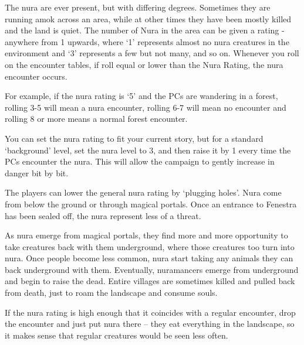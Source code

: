 \begin{multicols}{2}

The nura are ever present, but with differing degrees.  Sometimes they are running amok across an area, while at other times they have been mostly killed and the land is quiet.  The number of Nura in the area can be given a rating - anywhere from 1 upwards, where `1' represents almost no nura creatures in the environment and `3' represents a few but not many, and so on.  Whenever you roll on the encounter tables, if roll equal or lower than the Nura Rating, the nura encounter occurs.

	For example, if the nura rating is `5' and the PCs are wandering in a forest, rolling 3-5 will mean a nura encounter, rolling 6-7 will mean no encounter and rolling 8 or more means a normal forest encounter.

	You can set the nura rating to fit your current story, but for a standard `background' level, set the nura level to 3, and then raise it by 1 every time the PCs encounter the nura.  This will allow the campaign to gently increase in danger bit by bit.

The players can lower the general nura rating by `plugging holes'.  Nura come from below the ground or through magical portals.  Once an entrance to Fenestra has been sealed off, the nura represent less of a threat.

As nura emerge from magical portals, they find more and more opportunity to take creatures back with them underground, where those creatures too turn into nura.  Once people become less common, nura start taking any animals they can back underground with them.  Eventually, nuramancers emerge from underground and begin to raise the dead.  Entire villages are sometimes killed and pulled back from death, just to roam the landscape and consume souls.

If the nura rating is high enough that it coincides with a regular encounter, drop the encounter and just put nura there -- they eat everything in the landscape, so it makes sense that regular creatures would be seen less often.


\end{multicols}
